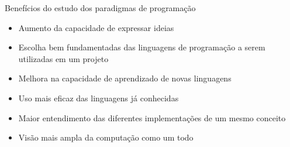 \begin{frame}[fragile]{Benefícios do estudo dos paradigmas de programação}

    \begin{itemize}
        \item Aumento da capacidade de expressar ideias
        \item Escolha bem fundamentadas das linguagens de programação a serem utilizadas em um 
            projeto
        \item Melhora na capacidade de aprendizado de novas linguagens
        \item Uso mais eficaz das linguagens já conhecidas
        \item Maior entendimento das diferentes implementações de um mesmo conceito
        \item Visão mais ampla da computação como um todo
    \end{itemize}

\end{frame}
